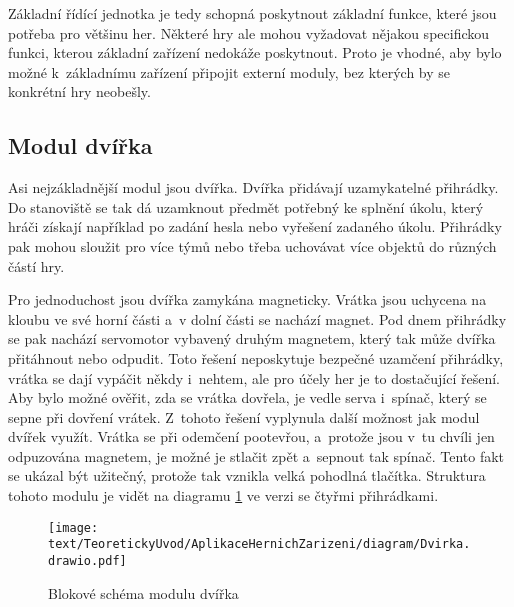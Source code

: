 Základní řídící jednotka je tedy schopná poskytnout základní funkce, které jsou potřeba pro většinu her.
Některé hry ale mohou vyžadovat nějakou specifickou funkci, kterou základní zařízení nedokáže poskytnout.
Proto je vhodné, aby bylo možné k~základnímu zařízení připojit externí moduly, bez kterých by se konkrétní hry neobešly.

\subsection{Modul dvířka}
Asi nejzákladnější modul jsou dvířka.
Dvířka přidávají uzamykatelné přihrádky.
Do stanoviště se tak dá uzamknout předmět potřebný ke splnění úkolu, který hráči získají například po zadání hesla nebo vyřešení zadaného úkolu.
Přihrádky pak mohou sloužit pro více týmů nebo třeba uchovávat více objektů do různých částí hry.

Pro jednoduchost jsou dvířka zamykána magneticky.
Vrátka jsou uchycena na kloubu ve své horní části a~v dolní části se nachází magnet.
Pod dnem přihrádky se pak nachází servomotor vybavený druhým magnetem, který tak může dvířka přitáhnout nebo odpudit.
Toto řešení neposkytuje bezpečné uzamčení přihrádky, vrátka se dají vypáčit někdy i~nehtem, ale pro účely her je to dostačující řešení.
Aby bylo možné ověřit, zda se vrátka dovřela, je vedle serva i~spínač, který se sepne při dovření vrátek.
Z~tohoto řešení vyplynula další možnost jak modul dvířek využít.
Vrátka se při odemčení pootevřou, a~protože jsou v~tu chvíli jen odpuzována magnetem, je možné je stlačit zpět a~sepnout tak spínač.
Tento fakt se ukázal být užitečný, protože tak vznikla velká pohodlná tlačítka.
Struktura tohoto modulu je vidět na diagramu \ref{fig:diagram_dvirka} ve verzi se čtyřmi přihrádkami.

\begin{figure}[h]
    \centering
    \texttt{[image: text/TeoretickyUvod/AplikaceHernichZarizeni/diagram/Dvirka.drawio.pdf]}
    \caption{Blokové schéma modulu dvířka}
    \label{fig:diagram_dvirka}
\end{figure}
 
